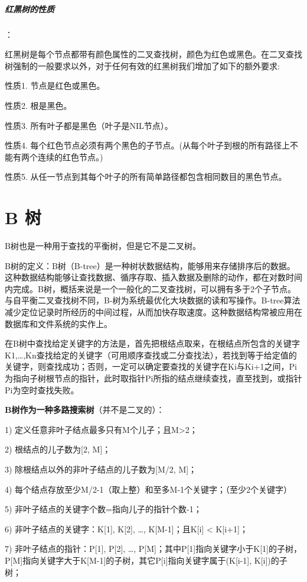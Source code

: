 \documentclass[UTF8,a4paper,12pt]{ctexbook}
\begin{document}
			
			\subparagraph{红黑树的性质}：
			
				红黑树是每个节点都带有颜色属性的二叉查找树，颜色为红色或黑色。在二叉查找树强制的一般要求以外，对于任何有效的红黑树我们增加了如下的额外要求:
				
				性质1. 节点是红色或黑色。
				
				性质2. 根是黑色。
				
				性质3. 所有叶子都是黑色（叶子是NIL节点）。
				
				性质4. 每个红色节点必须有两个黑色的子节点。(从每个叶子到根的所有路径上不能有两个连续的红色节点。)
				
				性质5. 从任一节点到其每个叶子的所有简单路径都包含相同数目的黑色节点。
		\section{B 树}
			B树也是一种用于查找的平衡树，但是它不是二叉树。
			
			B树的定义：B树（B-tree）是一种树状数据结构，能够用来存储排序后的数据。这种数据结构能够让查找数据、循序存取、插入数据及删除的动作，都在对数时间内完成。B树，概括来说是一个一般化的二叉查找树，可以拥有多于2个子节点。与自平衡二叉查找树不同，B-树为系统最优化大块数据的读和写操作。B-tree算法减少定位记录时所经历的中间过程，从而加快存取速度。这种数据结构常被应用在数据库和文件系统的实作上。
			
			在B树中查找给定关键字的方法是，首先把根结点取来，在根结点所包含的关键字K1,…,Kn查找给定的关键字（可用顺序查找或二分查找法），若找到等于给定值的关键字，则查找成功；否则，一定可以确定要查找的关键字在Ki与Ki+1之间，Pi为指向子树根节点的指针，此时取指针Pi所指的结点继续查找，直至找到，或指针Pi为空时查找失败。
			
			\textbf{B树作为一种多路搜索树}（并不是二叉的）：
			
			1) 定义任意非叶子结点最多只有M个儿子；且M>2；
			
			2) 根结点的儿子数为[2, M]；
			
			3) 除根结点以外的非叶子结点的儿子数为[M/2, M]；
			
			4) 每个结点存放至少M/2-1（取上整）和至多M-1个关键字；（至少2个关键字）
			
			5) 非叶子结点的关键字个数=指向儿子的指针个数-1；
			
			6) 非叶子结点的关键字：K[1], K[2], …, K[M-1]；且K[i] < K[i+1]；
			
			7) 非叶子结点的指针：P[1], P[2], …, P[M]；其中P[1]指向关键字小于K[1]的子树，P[M]指向关键字大于K[M-1]的子树，其它P[i]指向关键字属于(K[i-1], K[i])的子树；
			
\end{document}

